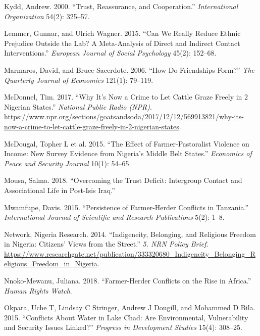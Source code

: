\documentclass[11pt]{article}
\begin{document}
\leavevmode\hypertarget{ref-kydd2000trust}{}%
Kydd, Andrew. 2000. ``Trust, Reassurance, and Cooperation.''
\emph{International Organization} 54(2): 325--57.

\leavevmode\hypertarget{ref-lemmer2015can}{}%
Lemmer, Gunnar, and Ulrich Wagner. 2015. ``Can We Really Reduce Ethnic
Prejudice Outside the Lab? A Meta-Analysis of Direct and Indirect
Contact Interventions.'' \emph{European Journal of Social Psychology}
45(2): 152--68.

\leavevmode\hypertarget{ref-marmaros2006friendships}{}%
Marmaros, David, and Bruce Sacerdote. 2006. ``How Do Friendships Form?''
\emph{The Quarterly Journal of Economics} 121(1): 79--119.

\leavevmode\hypertarget{ref-mcdonnel2017graze}{}%
McDonnel, Tim. 2017. ``Why It's Now a Crime to Let Cattle Graze Freely
in 2 Nigerian States.'' \emph{National Public Radio (NPR)}.
\url{https://www.npr.org/sections/goatsandsoda/2017/12/12/569913821/why-its-now-a-crime-to-let-cattle-graze-freely-in-2-nigerian-states}.

\leavevmode\hypertarget{ref-mcdougal2015effect}{}%
McDougal, Topher L et al. 2015. ``The Effect of Farmer-Pastoralist
Violence on Income: New Survey Evidence from Nigeria's Middle Belt
States.'' \emph{Economics of Peace and Security Journal} 10(1): 54--65.

\leavevmode\hypertarget{ref-mousa2018overcome}{}%
Mousa, Salma. 2018. ``Overcoming the Trust Deficit: Intergroup Contact
and Associational Life in Post-Isis Iraq.''

\leavevmode\hypertarget{ref-mwamfupe2015persistence}{}%
Mwamfupe, Davis. 2015. ``Persistence of Farmer-Herder Conflicts in
Tanzania.'' \emph{International Journal of Scientific and Research
Publications} 5(2): 1--8.

\leavevmode\hypertarget{ref-nigeria2014freedom}{}%
Network, Nigeria Research. 2014. ``Indigeneity, Belonging, and Religious
Freedom in Nigeria: Citizens' Views from the Street.'' \emph{5. NRN
Policy Brief}.
\url{https://www.researchgate.net/publication/333320680_Indigeneity_Belonging_Religious_Freedom_in_Nigeria}.

\leavevmode\hypertarget{ref-hrc2018farmer}{}%
Nnoko-Mewanu, Juliana. 2018. ``Farmer-Herder Conflicts on the Rise in
Africa.'' \emph{Human Rights Watch}.

\leavevmode\hypertarget{ref-okpara2015conflicts}{}%
Okpara, Uche T, Lindsay C Stringer, Andrew J Dougill, and Mohammed D
Bila. 2015. ``Conflicts About Water in Lake Chad: Are Environmental,
Vulnerability and Security Issues Linked?'' \emph{Progress in
Development Studies} 15(4): 308--25.
\end{document}
